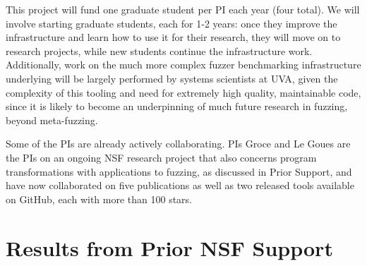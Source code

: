 This project will fund one graduate student per PI each year
(four total).  We will
involve starting graduate students, each for 1-2 years: once they
improve the infrastructure and learn how to use it for their research,
they will move on to research projects, while new
students continue the infrastructure work.  Additionally, work on the much more 
complex fuzzer benchmarking infrastructure underlying will be largely performed 
by systems scientists at UVA, given the complexity of this tooling and need for 
extremely high quality, maintainable code, since it is likely to become an 
underpinning of much future research in fuzzing, beyond meta-fuzzing.


Some of the PIs are already actively collaborating.
PIs Groce and Le Goues are the PIs on an ongoing NSF research project
that also concerns program transformations with applications to
fuzzing, as discussed in Prior Support, and have now collaborated on
five publications as well as two released tools available on GitHub,
each with more than 100 stars.

\section{Results from Prior NSF Support}


